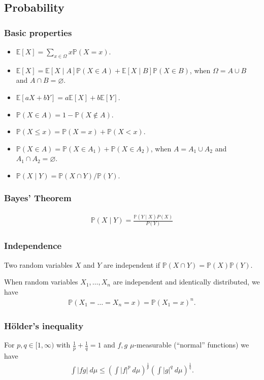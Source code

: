 \subsection{Probability}

\subsubsection{Basic properties}
\begin{itemize}
    \item $\mathbb E[X] = \sum_{x \in \Omega} x\mathbb P(X = x)$.
    \item $\mathbb E[X] = \mathbb E[X \mid A]\mathbb P(X \in A) + \mathbb E[X \mid B]\mathbb P(X \in B)$, when $\Omega = A \cup B$ and $A \cap B = \varnothing$.
    \item $\mathbb E[aX + bY] = a\mathbb E[X] + b\mathbb E[Y]$.
    \item $\mathbb P(X \in A) = 1 - \mathbb P(X \not\in A)$.
    \item $\mathbb P(X \leq x) = \mathbb P(X = x) + \mathbb P(X < x)$.
    \item $\mathbb P(X \in A) = \mathbb P(X \in A_1) + \mathbb P(X \in A_2)$, when $A = A_1 \cup A_2$ and $A_1 \cap A_2 = \varnothing$.
    \item $\mathbb P(X \mid Y) = \mathbb P(X \cap Y) / \mathbb P(Y)$.
\end{itemize}

\subsubsection{Bayes' Theorem}
\begin{align*}
    \mathbb P(X \mid Y) = \frac{\mathbb P(Y \mid X)P(X)}{P(Y)}
\end{align*}

\subsubsection{Independence}
Two random variables $X$ and $Y$ are independent if $\mathbb P(X \cap Y) = \mathbb P(X)\mathbb P(Y)$.

When random variables $X_1, \dots, X_n$ are independent and identically distributed, we have
\begin{align*}
    \mathbb P(X_1 = \dots = X_n = x) = \mathbb P(X_1 = x)^n.
\end{align*}

\subsubsection{Hölder's inequality}
For $p, q \in [1, \infty)$ with $\frac1p + \frac1q = 1$ and $f, g$ $\mu$-measurable (``normal'' functions) we have
\begin{align*}
    \int |fg|\ d\mu \leq \left(\int |f|^p\ d\mu\right)^{\frac1p}\left(\int |g|^q\ d\mu\right)^{\frac1q}.
\end{align*}

